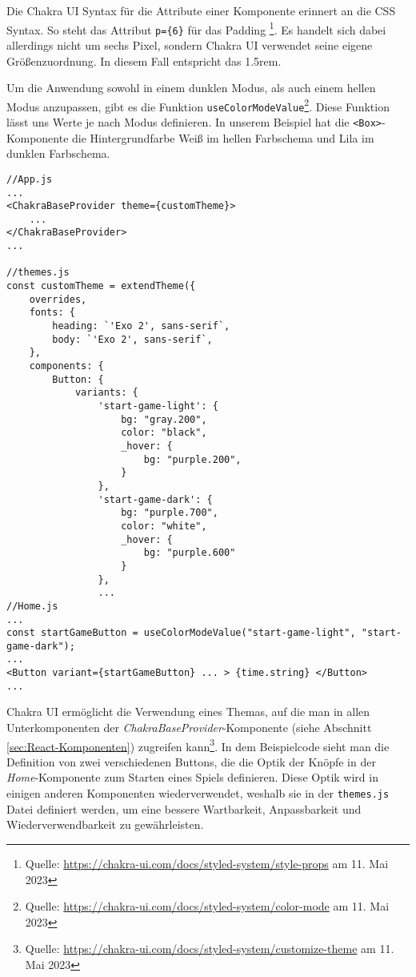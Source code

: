 Die Chakra UI Syntax für die Attribute einer Komponente erinnert an die CSS Syntax. So steht das Attribut \verb|p={6}| für das Padding \footnote{Quelle: \url{https://chakra-ui.com/docs/styled-system/style-props} am 11. Mai 2023}. Es handelt sich dabei allerdings nicht um sechs Pixel, sondern Chakra UI verwendet seine eigene Größenzuordnung. In diesem Fall entspricht das 1.5rem.

Um die Anwendung sowohl in einem dunklen Modus, als auch einem hellen Modus anzupassen, gibt es die Funktion \verb|useColorModeValue|\footnote{Quelle: \url{https://chakra-ui.com/docs/styled-system/color-mode} am 11. Mai 2023}. Diese Funktion lässt uns Werte je nach Modus definieren. In unserem Beispiel hat die \verb|<Box>|-Komponente die Hintergrundfarbe Weiß im hellen Farbschema und Lila im dunklen Farbschema.

\begin{lstlisting}[style=codeStyle, caption={Verwendung von einem Thema mit Chakra UI}, label={lst:themes.js}]
//App.js
...
<ChakraBaseProvider theme={customTheme}>
    ...
</ChakraBaseProvider>
...

//themes.js
const customTheme = extendTheme({
    overrides,
    fonts: {
        heading: `'Exo 2', sans-serif`,
        body: `'Exo 2', sans-serif`,
    },
    components: {
        Button: {
            variants: {
                'start-game-light': {
                    bg: "gray.200",
                    color: "black",
                    _hover: {
                        bg: "purple.200",
                    }
                },
                'start-game-dark': {
                    bg: "purple.700",
                    color: "white",
                    _hover: {
                        bg: "purple.600"
                    }
                },
                ...
//Home.js
...
const startGameButton = useColorModeValue("start-game-light", "start-game-dark");
...
<Button variant={startGameButton} ... > {time.string} </Button>
...
\end{lstlisting}

Chakra UI ermöglicht die Verwendung eines Themas, auf die man in allen Unterkomponenten der \textit{ChakraBaseProvider}-Komponente (siehe Abschnitt \ref{sec:React-Komponenten}) zugreifen kann\footnote{Quelle: \url{https://chakra-ui.com/docs/styled-system/customize-theme} am 11. Mai 2023}. In dem Beispielcode sieht man die Definition von zwei verschiedenen Buttons, die die Optik der Knöpfe in der \textit{Home}-Komponente zum Starten eines Spiels definieren. Diese Optik wird in einigen anderen Komponenten wiederverwendet, weshalb sie in der \verb|themes.js| Datei definiert werden, um eine bessere Wartbarkeit, Anpassbarkeit und Wiederverwendbarkeit zu gewährleisten.


